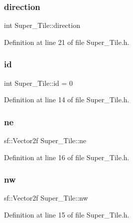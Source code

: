 \subsubsection{\texorpdfstring{direction}{direction}}
{\footnotesize\ttfamily int Super\+\_\+\+Tile\+::direction}



Definition at line 21 of file Super\+\_\+\+Tile.\+h.

\hypertarget{class_super___tile_afc4dffc7fdb4919c9790e1634c909698}{}\label{class_super___tile_afc4dffc7fdb4919c9790e1634c909698} 
\subsubsection{\texorpdfstring{id}{id}}
{\footnotesize\ttfamily int Super\+\_\+\+Tile\+::id = 0}



Definition at line 14 of file Super\+\_\+\+Tile.\+h.

\hypertarget{class_super___tile_a55f6d2860da36f13019bd4e0d18364ca}{}\label{class_super___tile_a55f6d2860da36f13019bd4e0d18364ca} 
\subsubsection{\texorpdfstring{ne}{ne}}
{\footnotesize\ttfamily sf\+::\+Vector2f Super\+\_\+\+Tile\+::ne}



Definition at line 16 of file Super\+\_\+\+Tile.\+h.

\hypertarget{class_super___tile_ad6bcea1fd54f67808f54ba2aacd88596}{}\label{class_super___tile_ad6bcea1fd54f67808f54ba2aacd88596} 
\subsubsection{\texorpdfstring{nw}{nw}}
{\footnotesize\ttfamily sf\+::\+Vector2f Super\+\_\+\+Tile\+::nw}



Definition at line 15 of file Super\+\_\+\+Tile.\+h.

\hypertarget{class_super___tile_ab384b89a7a631b8b75c4d405c51a23e1}{}\label{class_super___tile_ab384b89a7a631b8b75c4d405c51a23e1} 
